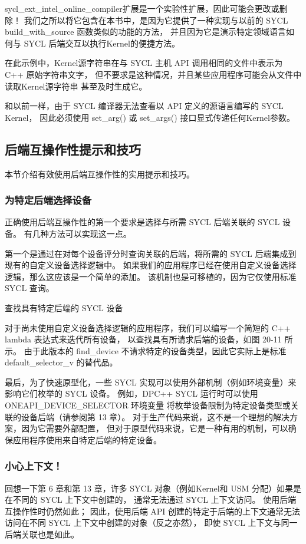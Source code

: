 \begin{remark}[注意，实验性扩展！]
sycl\_ext\_intel\_online\_compiler扩展是一个实验性扩展，因此可能会更改或删除！
我们之所以将它包含在本书中，是因为它提供了一种实现与以前的 SYCL build\_with\_source 函数类似的功能的方法，
并且因为它是演示特定领域语言如何与 SYCL 后端交互以执行Kernel的便捷方法。
\end{remark}

在此示例中，Kernel源字符串在与 SYCL 主机 API 调用相同的文件中表示为 C++ 原始字符串文字，
但不要求是这种情况，并且某些应用程序可能会从文件中读取Kernel源字符串 甚至及时生成它。

和以前一样，由于 SYCL 编译器无法查看以 API 定义的源语言编写的 SYCL Kernel，
因此必须使用 set\_arg() 或 set\_args() 接口显式传递任何Kernel参数。

\subsection{后端互操作性提示和技巧}
本节介绍有效使用后端互操作性的实用提示和技巧。

\subsubsection{为特定后端选择设备}
正确使用后端互操作性的第一个要求是选择与所需 SYCL 后端关联的 SYCL 设备。 
有几种方法可以实现这一点。

第一个是通过在对每个设备评分时查询关联的后端，将所需的 SYCL 后端集成到现有的自定义设备选择逻辑中。 
如果我们的应用程序已经在使用自定义设备选择逻辑，那么这应该是一个简单的添加。 
该机制也是可移植的，因为它仅使用标准 SYCL 查询。

{\color{red} 查找具有特定后端的 SYCL 设备}

对于尚未使用自定义设备选择逻辑的应用程序，我们可以编写一个简短的 C++ lambda 表达式来迭代所有设备，
以查找具有所请求后端的设备，如图 20-11 所示。 
由于此版本的 find\_device 不请求特定的设备类型，因此它实际上是标准 default\_selector\_v 的替代品。

最后，为了快速原型化，一些 SYCL 实现可以使用外部机制（例如环境变量）来影响它们枚举的 SYCL 设备。 
例如，DPC++ SYCL 运行时可以使用 ONEAPI\_DEVICE\_SELECTOR 环境变量
将枚举设备限制为特定设备类型或关联的设备后端（请参阅第 13 章）。 
对于生产代码来说，这不是一个理想的解决方案，因为它需要外部配置，
但对于原型代码来说，它是一种有用的机制，可以确保应用程序使用来自特定后端的特定设备。

\subsubsection{小心上下文！}
回想一下第 6 章和第 13 章，许多 SYCL 对象（例如Kernel和 USM 分配）如果是在不同的 SYCL 上下文中创建的，
通常无法通过 SYCL 上下文访问。 使用后端互操作性时仍然如此； 
因此，使用后端 API 创建的特定于后端的上下文通常无法访问在不同 SYCL 上下文中创建的对象（反之亦然），
即使 SYCL 上下文与同一后端关联也是如此。

